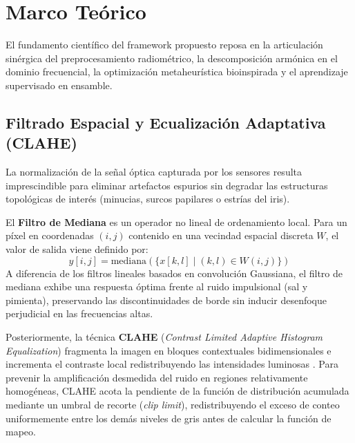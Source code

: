 \section{Marco Teórico}\label{sec:background}

El fundamento científico del framework propuesto reposa en la articulación sinérgica del preprocesamiento radiométrico, la descomposición armónica en el dominio frecuencial, la optimización metaheurística bioinspirada y el aprendizaje supervisado en ensamble.

\subsection{Filtrado Espacial y Ecualización Adaptativa (CLAHE)}
La normalización de la señal óptica capturada por los sensores resulta imprescindible para eliminar artefactos espurios sin degradar las estructuras topológicas de interés (minucias, surcos papilares o estrías del iris).

El \textbf{Filtro de Mediana} es un operador no lineal de ordenamiento local. Para un píxel en coordenadas $(i,j)$ contenido en una vecindad espacial discreta $W$, el valor de salida viene definido por:
\begin{equation}
y[i,j] = \mathrm{mediana}\left(\{x[k,l] \mid (k,l) \in W(i,j)\}\right)
\end{equation}
A diferencia de los filtros lineales basados en convolución Gaussiana, el filtro de mediana exhibe una respuesta óptima frente al ruido impulsional (sal y pimienta), preservando las discontinuidades de borde sin inducir desenfoque perjudicial en las frecuencias altas.

Posteriormente, la técnica \textbf{CLAHE} (\textit{Contrast Limited Adaptive Histogram Equalization}) fragmenta la imagen en bloques contextuales bidimensionales e incrementa el contraste local redistribuyendo las intensidades luminosas \cite{fieguth2022}. Para prevenir la amplificación desmedida del ruido en regiones relativamente homogéneas, CLAHE acota la pendiente de la función de distribución acumulada mediante un umbral de recorte (\textit{clip limit}), redistribuyendo el exceso de conteo uniformemente entre los demás niveles de gris antes de calcular la función de mapeo.

